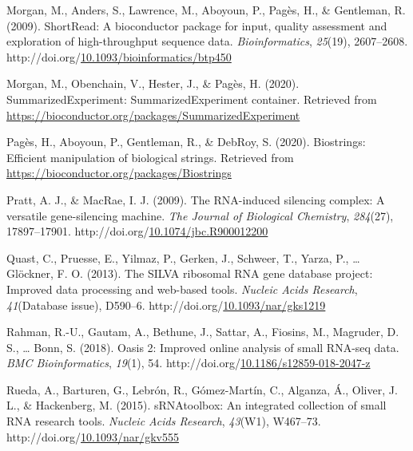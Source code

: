 \documentclass[12pt,twoside]{reedthesis}
\newlength{\cslhangindent}
\newenvironment{CSLReferences}[2] %
 {%
  \setlength{\parindent}{0pt}
  \ifodd #1 \everypar{\setlength{\hangindent}{\cslhangindent}}\ignorespaces\fi
  \ifnum #2 > 0
  \setlength{\parskip}{#2\baselineskip}
  \fi
 }%
 {}
\begin{document}
\begin{CSLReferences}{1}{0}
\leavevmode{}%
Morgan, M., Anders, S., Lawrence, M., Aboyoun, P., Pagès, H., \& Gentleman, R. (2009). ShortRead: A bioconductor package for input, quality assessment and exploration of high-throughput sequence data. \emph{Bioinformatics}, \emph{25}(19), 2607--2608. http://doi.org/\href{https://doi.org/10.1093/bioinformatics/btp450}{10.1093/bioinformatics/btp450}

\leavevmode{}%
Morgan, M., Obenchain, V., Hester, J., \& Pagès, H. (2020). SummarizedExperiment: SummarizedExperiment container. Retrieved from \url{https://bioconductor.org/packages/SummarizedExperiment}

\leavevmode{}%
Pagès, H., Aboyoun, P., Gentleman, R., \& DebRoy, S. (2020). Biostrings: Efficient manipulation of biological strings. Retrieved from \url{https://bioconductor.org/packages/Biostrings}

\leavevmode{}%
Pratt, A. J., \& MacRae, I. J. (2009). The RNA-induced silencing complex: A versatile gene-silencing machine. \emph{The Journal of Biological Chemistry}, \emph{284}(27), 17897--17901. http://doi.org/\href{https://doi.org/10.1074/jbc.R900012200}{10.1074/jbc.R900012200}

\leavevmode{}%
Quast, C., Pruesse, E., Yilmaz, P., Gerken, J., Schweer, T., Yarza, P., \ldots{} Glöckner, F. O. (2013). The SILVA ribosomal RNA gene database project: Improved data processing and web-based tools. \emph{Nucleic Acids Research}, \emph{41}(Database issue), D590--6. http://doi.org/\href{https://doi.org/10.1093/nar/gks1219}{10.1093/nar/gks1219}

\leavevmode{}%
Rahman, R.-U., Gautam, A., Bethune, J., Sattar, A., Fiosins, M., Magruder, D. S., \ldots{} Bonn, S. (2018). Oasis 2: Improved online analysis of small RNA-seq data. \emph{BMC Bioinformatics}, \emph{19}(1), 54. http://doi.org/\href{https://doi.org/10.1186/s12859-018-2047-z}{10.1186/s12859-018-2047-z}

\leavevmode{}%
Rueda, A., Barturen, G., Lebrón, R., Gómez-Martín, C., Alganza, Á., Oliver, J. L., \& Hackenberg, M. (2015). sRNAtoolbox: An integrated collection of small RNA research tools. \emph{Nucleic Acids Research}, \emph{43}(W1), W467--73. http://doi.org/\href{https://doi.org/10.1093/nar/gkv555}{10.1093/nar/gkv555}


\end{CSLReferences}
\end{document}
